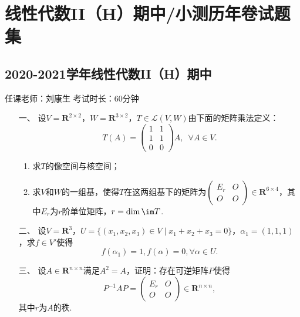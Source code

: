 \chapter*{线性代数II（H）期中/小测历年卷试题集}

\section*{2020-2021学年线性代数II（H）期中}

\begin{center}
    任课老师：刘康生\hspace{4em} 考试时长：60分钟
\end{center}

\begin{enumerate}
	\item[一、]设$V=\mathbf{R}^{2\times 2}$，$W=\mathbf{R}^{3\times 2}$，$T\in\mathcal{L}(V,W)$由下面的矩阵乘法定义：
	\[T(A)=\begin{pmatrix}
        1 & 1 \\ 1 & 1 \\ 0 & 0
    \end{pmatrix}A,\enspace \forall A\in V.\]
    \begin{enumerate}[label=(\arabic*)]
        \item 求$T$的像空间与核空间；
        \item 求$V$和$W$的一组基，使得$T$在这两组基下的矩阵为$\begin{pmatrix}
            E_r & O \\ O & O
        \end{pmatrix}\in\mathbf{R}^{6\times 4}$，其中$E_r$为$r$阶单位矩阵，$r=\dim\im T$.
    \end{enumerate}
	\item[二、]设$V=\mathbf{R}^3$，$U=\{(x_1,x_2,x_3)\in V\mid x_1+x_2+x_3=0\}$，$\alpha_1=(1,1,1)$，求$f\in V'$使得
	\[f(\alpha_1)=1,f(\alpha)=0,\forall\alpha\in U.\]
	\item[三、]设$A\in\mathbf{R}^{n\times n}$满足$A^2=A$，证明：存在可逆矩阵$P$使得
	\[P^{-1}AP=\begin{pmatrix}
        E_r & O \\ O & O
    \end{pmatrix}\in\mathbf{R}^{n\times n},\]
    其中$r$为$A$的秩.
\end{enumerate}
\newpage
